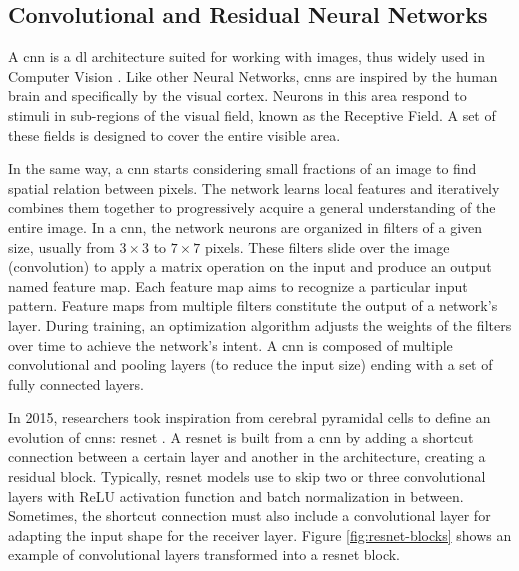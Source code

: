 


\subsection{Convolutional and Residual Neural Networks}
\label{subsec:resnet}

A \gls{cnn} is a \gls{dl} architecture suited for working with images, thus widely used in Computer Vision \cite{Khan_2020}. Like other Neural Networks, \gls{cnn}s are inspired by the human brain and specifically by the visual cortex. Neurons in this area respond to stimuli in sub-regions of the visual field, known as the Receptive Field. A set of these fields is designed to cover the entire visible area. 

In the same way, a \gls{cnn} starts considering small fractions of an image to find spatial relation between pixels. The network learns local features and iteratively combines them together to progressively acquire a general understanding of the entire image. In a \gls{cnn}, the network neurons are organized in filters of a given size, usually from $3 \times 3$ to $7 \times 7$ pixels. These filters slide over the image (convolution) to apply a matrix operation on the input and produce an output named feature map. Each feature map aims to recognize a particular input pattern. Feature maps from multiple filters constitute the output of a network's layer. During training, an optimization algorithm adjusts the weights of the filters over time to achieve the network's intent. A \gls{cnn} is composed of multiple convolutional and pooling layers (to reduce the input size) ending with a set of fully connected layers.

\medskip

In 2015, researchers took inspiration from cerebral pyramidal cells to define an evolution of \gls{cnn}s: \gls{resnet} \cite{he2015deep}. A \gls{resnet} is built from a \gls{cnn} by adding a shortcut connection between a certain layer and another in the architecture, creating a residual block. Typically, \gls{resnet} models use to skip two or three convolutional layers with ReLU activation function \cite{act-relu} and batch normalization \cite{bacthnorm} in between. Sometimes, the shortcut connection must also include a convolutional layer for adapting the input shape for the receiver layer. Figure \ref{fig:resnet-blocks} shows an example of convolutional layers transformed into a \gls{resnet} block.

